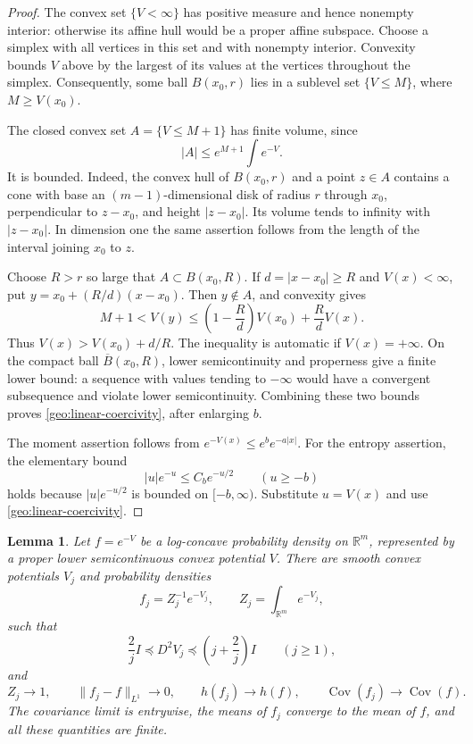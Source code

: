 \documentclass[11pt]{article}
\newcommand{\R}{\mathbb R}
\DeclareMathOperator{\Cov}{Cov}
\newcommand{\Id}{I}
\newcommand{\norm}[1]{\lVert #1\rVert}
\newtheorem{lemma}[theorem]{Lemma}
\theoremstyle{definition}
\theoremstyle{remark}
\numberwithin{equation}{section}
\begin{document}
\begin{proof}
The convex set $\{V<\infty\}$ has positive measure and hence nonempty
interior: otherwise its affine hull would be a proper affine subspace.
Choose a simplex with all vertices in this set and with nonempty interior.
Convexity bounds $V$ above by the largest of its values at the vertices
throughout the simplex.  Consequently, some ball $B(x_0,r)$ lies in a
sublevel set $\{V\leq M\}$, where $M\geq V(x_0)$.

The closed convex set $A=\{V\leq M+1\}$ has finite volume, since
\[
  |A|\leq e^{M+1}\int e^{-V}.
\]
It is bounded.  Indeed, the convex hull of $B(x_0,r)$ and a point $z\in A$
contains a cone with base an $(m-1)$-dimensional disk of radius $r$ through
$x_0$, perpendicular to $z-x_0$, and height $|z-x_0|$.  Its volume tends to
infinity with $|z-x_0|$.  In dimension one the same assertion follows from
the length of the interval joining $x_0$ to $z$.

Choose $R>r$ so large that $A\subset B(x_0,R)$.  If
$d=|x-x_0|\geq R$ and $V(x)<\infty$, put
$y=x_0+(R/d)(x-x_0)$.  Then $y\notin A$, and convexity gives
\[
  M+1<V(y)\leq \left(1-\frac Rd\right)V(x_0)+\frac RdV(x).
\]
Thus $V(x)>V(x_0)+d/R$.  The inequality is automatic if $V(x)=+\infty$.
On the compact ball $\overline B(x_0,R)$, lower semicontinuity and properness
give a finite lower bound: a sequence with values tending to $-\infty$
would have a convergent subsequence and violate lower semicontinuity.
Combining these two bounds proves \eqref{geo:linear-coercivity}, after
enlarging $b$.

The moment assertion follows from $e^{-V(x)}\leq e^b e^{-a|x|}$.
For the entropy assertion, the elementary bound
\begin{equation}\label{geo:entropy-domination}
  |u|e^{-u}\leq C_b e^{-u/2}\qquad(u\geq-b)
\end{equation}
holds because $|u|e^{-u/2}$ is bounded on $[-b,\infty)$.
Substitute $u=V(x)$ and use \eqref{geo:linear-coercivity}.
\end{proof}

\begin{lemma}\label{geo:approximation}
Let $f=e^{-V}$ be a log-concave probability density on $\R^m$, represented
by a proper lower semicontinuous convex potential $V$.  There are smooth
convex potentials $V_j$ and probability densities
\[
  f_j=Z_j^{-1}e^{-V_j},\qquad Z_j=\int_{\R^m}e^{-V_j},
\]
such that
\begin{equation}\label{geo:hessian-bounds}
  \frac2j\Id\preceq D^2V_j\preceq\left(j+\frac2j\right)\Id
  \qquad(j\geq1),
\end{equation}
and
\begin{equation}\label{geo:approximation-limits}
  Z_j\longrightarrow1,\qquad \norm{f_j-f}_{L^1}\longrightarrow0,\qquad
  h(f_j)\longrightarrow h(f),\qquad
  \Cov(f_j)\longrightarrow\Cov(f).
\end{equation}
The covariance limit is entrywise, the means of $f_j$ converge to the mean
of $f$, and all these quantities are finite.
\end{lemma}
\end{document}
